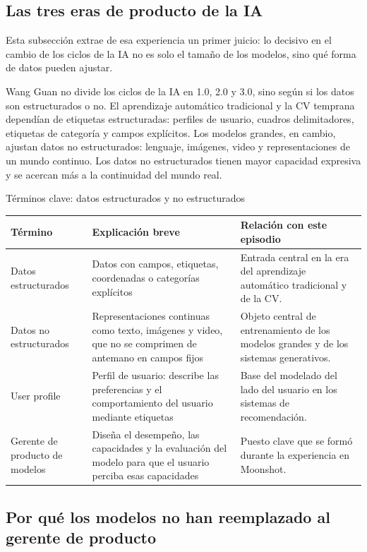 \documentclass[a4paper]{article}
\begin{document}
\subsection{Las tres eras de producto de la IA}

Esta subsección extrae de esa experiencia un primer juicio: lo decisivo en el cambio de los ciclos de la IA no es solo el tamaño de los modelos, sino qué forma de datos pueden ajustar.

Wang Guan no divide los ciclos de la IA en 1.0, 2.0 y 3.0, sino según si los datos son estructurados o no. El aprendizaje automático tradicional y la CV temprana dependían de etiquetas estructuradas: perfiles de usuario, cuadros delimitadores, etiquetas de categoría y campos explícitos. Los modelos grandes, en cambio, ajustan datos no estructurados: lenguaje, imágenes, video y representaciones de un mundo continuo. Los datos no estructurados tienen mayor capacidad expresiva y se acercan más a la continuidad del mundo real.

\begin{knowledgebox}{Términos clave: datos estructurados y no estructurados}
\begin{tabularx}{\textwidth}{p{}p{}X}
\toprule
Término & Explicación breve & Relación con este episodio \\
\midrule
Datos estructurados & Datos con campos, etiquetas, coordenadas o categorías explícitos & Entrada central en la era del aprendizaje automático tradicional y de la CV. \\
Datos no estructurados & Representaciones continuas como texto, imágenes y video, que no se comprimen de antemano en campos fijos & Objeto central de entrenamiento de los modelos grandes y de los sistemas generativos. \\
User profile & Perfil de usuario: describe las preferencias y el comportamiento del usuario mediante etiquetas & Base del modelado del lado del usuario en los sistemas de recomendación. \\
Gerente de producto de modelos & Diseña el desempeño, las capacidades y la evaluación del modelo para que el usuario perciba esas capacidades & Puesto clave que se formó durante la experiencia en Moonshot. \\
\bottomrule
\end{tabularx}
\end{knowledgebox}

\subsection{Por qué los modelos no han reemplazado al gerente de producto}
\end{document}
